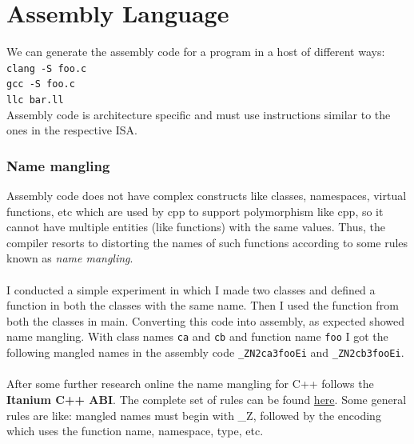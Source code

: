 \documentclass[12pt]{article}
\newcommand{\code}{\texttt}
\begin{document}
\section{Assembly Language}
We can generate the assembly code for a program in a host of different ways:\\
\code{clang -S foo.c}\\
\code{gcc -S foo.c}\\
\code{llc bar.ll}\\
Assembly code is architecture specific and must use instructions similar to the ones in the respective ISA.
\subsubsection{Name mangling}
Assembly code does not have complex constructs like classes, namespaces, virtual functions, etc which are used by cpp to support polymorphism like cpp, so it cannot have multiple entities (like functions) with the same values. Thus, the compiler resorts to distorting the names of such functions according to some rules known as \textit{name mangling}.\\~\\
I conducted a simple experiment in which I made two classes and defined a function in both the classes with the same name. Then I used the function from both the classes in main. Converting this code into assembly, as expected showed name mangling. With class names \code{ca} and \code{cb} and function name \code{foo} I got the following mangled names in the assembly code \code{\_ZN2ca3fooEi} and \code{\_ZN2cb3fooEi}.\\~\\
After some further research online the name mangling for C++ follows the \textbf{Itanium C++ ABI}. The complete set of rules can be found \href{https://itanium-cxx-abi.github.io/cxx-abi/abi.html#mangling}{here}. Some general rules are like: mangled names must begin with \_Z, followed by the encoding which uses the function name, namespace, type, etc.
\newpage
\end{document}

